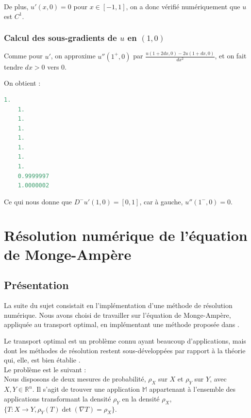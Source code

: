 \documentclass[12pt,a4paper,twoside]{article}
\begin{document}
De plus, $u'(x,0)=0$ pour $x \in [-1,1]$, on a donc vérifié numériquement que $u$ est $C^1$.

\subsubsection{Calcul des sous-gradients de $u$ en $(1,0)$}

Comme pour $u'$, on approxime $u''(1^{+},0)$ par $\frac{u(1+2dx,0) -2u(1+dx,0)}{dx^2}$, et on fait tendre $dx > 0$ vers $0$.

On obtient :


\begin{lstlisting}[frame=single, language=Scilab]
    1.  
    1.  
    1.  
    1.  
    1.  
    1.  
    1.  
    1.  
    0.9999997  
    1.0000002  
\end{lstlisting}

Ce qui nous donne que $D^{-}u'(1,0)=[0,1] $, car à gauche, $u''(1^{-},0)=0$.


\section{Résolution numérique de l'équation de Monge-Ampère}

\subsection{Présentation}

La suite du sujet consistait en l'implémentation d'une méthode de résolution numérique. Nous avons choisi de 
travailler sur l'équation de Monge-Ampère, appliquée au transport optimal, en implémentant une méthode 
proposée dans \cite{benamou2014numerical}.


Le transport optimal est un problème connu ayant beaucoup d'applications, mais dont les méthodes de résolution
restent sous-développées par rapport à la théorie qui, elle, est bien établie \cite{villani2008optimal}. \\


Le problème est le suivant : \\

Nous disposons de deux mesures de probabilité, $\rho_X$ sur $X$ et $\rho_Y$ sur $Y$,
avec $X,Y \in \mathbb{R}^n$. Il s'agit de trouver une application $\mathbb{M}$ appartenant à l'ensemble des applications 
transformant la densité $\rho_Y$ en la densité $\rho_X$,
$\lbrace T : X \to Y, \rho_Y(T) \det(\nabla T) = \rho_X \rbrace$.
\end{document}
